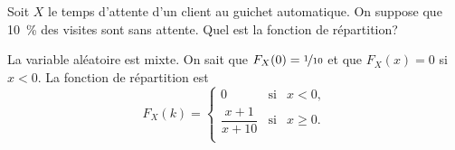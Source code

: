 \documentclass[11pt]{article}
\theoremstyle{remark}
\theoremstyle{definition}
\begin{document}
\pagebreak
\begin{exemple}
	Soit $X$ le temps d'attente d'un client au guichet automatique. On suppose
	que \SI{10}{\percent} des visites sont sans attente. Quel est la fonction
	de répartition?
	
	La variable aléatoire est mixte. On sait que $F_X(0)=\nicefrac{1}{10}$ et
	que $F_X(x)=0$ si $x<0$. La fonction de répartition est
	\begin{equation*}
		F_X(k)=\left\{
			\begin{matrix}
				0                 & \text{si} & x<0,\\
				\dfrac{x+1}{x+10} & \text{si} & x\geq 0.\\
			\end{matrix}
		\right.
	\end{equation*}
\end{exemple}
\end{document}
